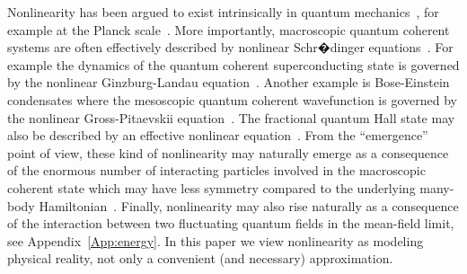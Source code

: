 \documentclass[showpacs,preprintnumbers,amsmath,amssymb,12pt]{revtex4-2}
\begin{document}
Nonlinearity has been argued to exist intrinsically in quantum
mechanics~\cite{weinberg89}, for example at the Planck
scale~\cite{Svetlichny:ijotp05}. More importantly, macroscopic quantum
coherent systems are often effectively described by nonlinear
Schr�dinger equations~\cite{pang}.  For example the dynamics of the
quantum coherent superconducting state is governed by the nonlinear
Ginzburg-Landau equation~\cite{Tinkham:Book75}. Another example is
Bose-Einstein condensates where the mesoscopic quantum coherent
wavefunction is governed by the nonlinear Gross-Pitaevskii
equation~\cite{BEC}. The fractional quantum Hall state may also be
described by an effective nonlinear equation~\cite{Zhang:prl89}.
From the ``emergence'' point of view, these kind of nonlinearity may
naturally emerge as a consequence of the enormous number of
interacting particles involved in the macroscopic coherent state which
may have less symmetry compared to the underlying many-body
Hamiltonian~\cite{Anderson:Science72}. Finally, nonlinearity may also
rise naturally as a consequence of the interaction between two
fluctuating quantum fields in the mean-field limit, see
Appendix~\ref{App:energy}. In this paper we view nonlinearity as
modeling physical reality, not only a convenient (and necessary)
approximation.
\end{document}

